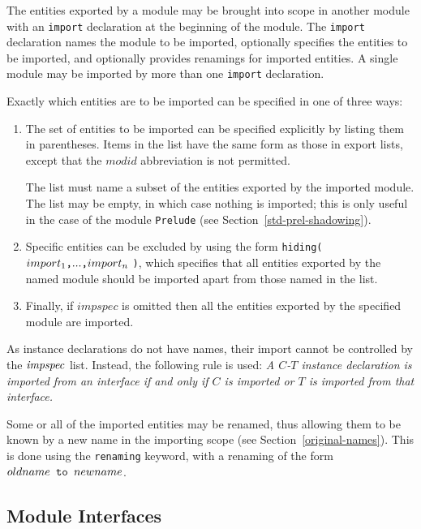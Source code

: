 The entities exported by a module may be brought into scope in
another module with
an \mbox{\tt import}
declaration at the beginning
of the module.  
The \mbox{\tt import} declaration names the module to be
imported, optionally specifies the entities to be imported,
and optionally provides renamings for imported entities.
A single module may be imported by more
than one \mbox{\tt import} declaration.

Exactly which entities are to be imported can be specified in one
of three ways:\nopagebreak[4]
\begin{enumerate}
\item
The set of entities to be imported can be specified explicitly
by listing them in parentheses.
Items in the list have the same form as those in export lists, except
that the $modid$ abbreviation is not permitted.

The list must name a subset of the 
entities exported by the imported module.
The list may be empty, in which case nothing is imported;
this is only useful in the case of the module \mbox{\tt Prelude} (see
Section~\ref{std-prel-shadowing}).
\item
Specific entities can be excluded by 
using the form \mbox{\tt hiding(} $import_1 \mbox{\tt ,} ... \mbox{\tt ,} import_n$ \mbox{\tt )}, which
specifies that all entities exported by the named module should
be imported apart from those named in the list.
\item
Finally, if $impspec$ is omitted then 
all the entities exported by the specified module are imported.
\end{enumerate}

As instance declarations do not have names, their import cannot be
controlled by the \mbox{$\it impspec$} list.  Instead, the following rule is
used: {\em A $C$-$T$ instance declaration is imported from an
interface if and only if $C$ is imported or $T$ is imported
from that interface.}

Some or all of the imported entities may be renamed,
thus allowing them to be known by a new name in the importing scope
(see Section~\ref{original-names}).  This is done using the
\mbox{\tt renaming} keyword, with a renaming of the form $oldname\mbox{\tt \ to\ }newname$.

\subsection{Module Interfaces}
\label{module-interfaces}

